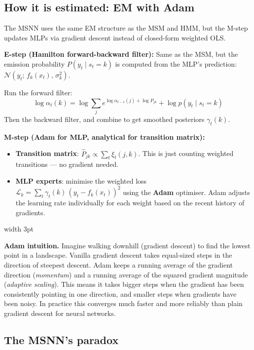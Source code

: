 \documentclass[11pt, a4paper]{article}
\newenvironment{intubox}{%
  \vspace{4pt}\par\noindent%
  {\color{darkblue}\vrule width 3pt}\hspace{6pt}%
  \begin{minipage}{\dimexpr\linewidth-9pt\relax}\vspace{2pt}%
}{%
  \vspace{2pt}\end{minipage}\par\vspace{4pt}%
}
\begin{document}
\subsection{How it is estimated: EM with Adam}

The MSNN uses the same EM structure as the MSM and HMM, but the M-step updates
MLPs via gradient descent instead of closed-form weighted OLS.

\medskip
\textbf{E-step (Hamilton forward-backward filter):}
Same as the MSM, but the emission probability $P(y_t\mid s_t=k)$ is computed
from the MLP's prediction: $\mathcal{N}(y_t;\,f_k(x_t),\,\sigma_k^2)$.

Run the forward filter:
\[
  \log\alpha_t(k) = \log\sum_j e^{\log\alpha_{t-1}(j) + \log P_{jk}} + \log p(y_t\mid s_t=k)
\]
Then the backward filter, and combine to get smoothed posteriors $\gamma_t(k)$.

\textbf{M-step (Adam for MLP, analytical for transition matrix):}

\begin{itemize}[itemsep=3pt]
  \item \textbf{Transition matrix}: $\hat{P}_{jk} \propto \sum_t \xi_t(j,k)$.
        This is just counting weighted transitions --- no gradient needed.
  \item \textbf{MLP experts}: minimise the weighted loss
        $\mathcal{L}_k = \sum_t \gamma_t(k)\,(y_t - f_k(x_t))^2$
        using the \textbf{Adam} optimiser. Adam adjusts the learning rate
        individually for each weight based on the recent history of gradients.
\end{itemize}

\begin{intubox}
\textbf{Adam intuition.}
Imagine walking downhill (gradient descent) to find the lowest point in a
landscape. Vanilla gradient descent takes equal-sized steps in the direction of
steepest descent. Adam keeps a running average of the gradient direction
(\emph{momentum}) and a running average of the squared gradient magnitude
(\emph{adaptive scaling}). This means it takes bigger steps when the gradient
has been consistently pointing in one direction, and smaller steps when
gradients have been noisy. In practice this converges much faster and more
reliably than plain gradient descent for neural networks.
\end{intubox}

\subsection{The MSNN's paradox}
\end{document}
